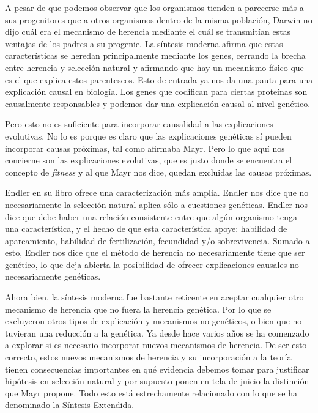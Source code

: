 A pesar de que podemos observar que los organismos tienden a parecerse más a sus progenitores que a otros organismos dentro de la misma población, Darwin no dijo cuál era el mecanismo de herencia mediante el cuál se transmitían estas ventajas de los padres a su progenie. La síntesis moderna afirma que estas características se heredan principalmente mediante los genes, cerrando la brecha entre herencia y selección natural y afirmando que hay un mecanismo físico que es el que explica estos parentescos. Esto de entrada ya nos da una pauta para una explicación causal en biología. Los genes que codifican para ciertas proteínas son causalmente responsables y podemos dar una explicación causal al nivel genético.

Pero esto no es suficiente para incorporar causalidad a las explicaciones evolutivas. No lo es porque es claro que las explicaciones genéticas sí pueden incorporar causas próximas, tal como afirmaba Mayr. Pero lo que aquí nos concierne son las explicaciones evolutivas, que es justo donde se encuentra el concepto de \emph{fitness} y al que Mayr nos dice, quedan excluidas las causas próximas.

Endler en su libro \cite{Endler1986} ofrece una caracterización más amplia. Endler nos dice que no necesariamente la selección natural aplica sólo a cuestiones genéticas. Endler nos dice que debe haber una relación consistente entre que algún organismo tenga una característica, y el hecho de que esta característica apoye: habilidad de apareamiento, habilidad de fertilización, fecundidad y/o sobrevivencia. Sumado a esto, Endler nos dice que el método de herencia no necesariamente tiene que ser genético, lo que deja abierta la posibilidad de ofrecer explicaciones causales no necesariamente genéticas.

Ahora bien, la síntesis moderna fue bastante reticente en aceptar cualquier otro mecanismo de herencia que no fuera la herencia genética. Por lo que se excluyeron otros tipos de explicación y mecanismos no genéticos, o bien que no tuvieran una reducción a la genética. Ya desde hace varios años se ha comenzado a explorar si es necesario incorporar nuevos mecanismos de herencia. De ser esto correcto, estos nuevos mecanismos de herencia y su incorporación a la teoría tienen consecuencias importantes en qué evidencia debemos tomar para justificar hipótesis en selección natural y por supuesto ponen en tela de juicio la distinción que Mayr propone. Todo esto está estrechamente relacionado con lo que se ha denominado la Síntesis Extendida.

